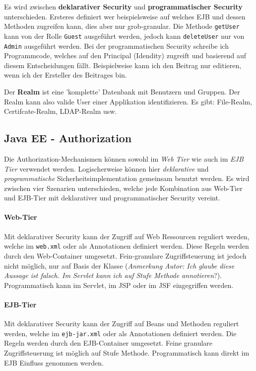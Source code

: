 Es wird zwischen \textbf{deklarativer Security} und \textbf{programmatischer Security} unterschieden. Ersteres definiert wer beispielsweise auf welches EJB und dessen Methoden zugreifen kann, dies aber nur grob-granular. Die Methode \verb|getUser| kann von der Rolle \verb|Guest| ausgeführt werden, jedoch kann \verb|deleteUser| nur von \verb|Admin| ausgeführt werden. Bei der programmatischen Security schreibe ich Programmcode, welches auf den Principal (Idendity) zugreift und basierend auf diesem Entscheidungen fällt. Beispielweise kann ich den Beitrag nur editieren, wenn ich der Ersteller des Beitrages bin.

Der \textbf{Realm} ist eine 'komplette' Datenbank mit Benutzern und Gruppen. Der Realm kann also valide User einer Applikation identifizieren. Es gibt: File-Realm, Certifcate-Realm, LDAP-Realm usw.


\subsection{Java EE - Authorization}
Die Authorization-Mechanismen können sowohl im \emph{Web Tier} wie auch im \emph{EJB Tier} verwendet werden. Logischerweise können hier \emph{deklarative} und \emph{programmatische} Sicherheitsimplementation gemeinsam benutzt werden. Es wird zwischen vier Szenarien unterschieden, welche jede Kombination aus Web-Tier und EJB-Tier mit deklarativer und programmatischer Security vereint.

\paragraph{Web-Tier}
Mit deklarativer Security kann der Zugriff auf Web Ressourcen reguliert werden, welche im \verb|web.xml| oder als Annotationen definiert werden. Diese Regeln werden durch den Web-Container umgesetzt. Fein-granulare Zugriffsteuerung ist jedoch nicht möglich, nur auf Basis der Klasse (\emph{Anmerkung Autor: Ich glaube diese Aussage ist falsch. Im Servlet kann ich auf Stufe Methode annotieren}?). Programmatisch kann im Servlet, im JSP oder im JSF eingegriffen werden. 

\paragraph{EJB-Tier}
Mit deklarativer Security kann der Zugriff auf Beans und Methoden reguliert werden, welche im \verb|ejb-jar.xml| oder als Annotationen definiert werden. Die Regeln werden durch den EJB-Container umgesetzt. Feine granulare Zugriffsteuerung ist möglich auf Stufe Methode. Programmatisch kann direkt im EJB Einfluss genommen werden.


